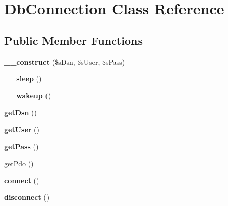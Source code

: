 \hypertarget{class_db_connection}{\section{Db\-Connection Class Reference}
\label{class_db_connection}
}
\subsection*{Public Member Functions}
\begin{DoxyCompactItemize}
\item 
\hypertarget{class_db_connection_a3b56a065a8591f3b8324b84aa2b6e99d}{{\bfseries \-\_\-\-\_\-construct} (\$s\-Dsn, \$s\-User, \$s\-Pass)}\label{class_db_connection_a3b56a065a8591f3b8324b84aa2b6e99d}

\item 
\hypertarget{class_db_connection_a2f87a9eaf06f135a323c3a4f429ecc11}{{\bfseries \-\_\-\-\_\-sleep} ()}\label{class_db_connection_a2f87a9eaf06f135a323c3a4f429ecc11}

\item 
\hypertarget{class_db_connection_a9fab9b70298e9bef12906e3b3431f3c3}{{\bfseries \-\_\-\-\_\-wakeup} ()}\label{class_db_connection_a9fab9b70298e9bef12906e3b3431f3c3}

\item 
\hypertarget{class_db_connection_a945af842314b399eca5af3c386f006bd}{{\bfseries get\-Dsn} ()}\label{class_db_connection_a945af842314b399eca5af3c386f006bd}

\item 
\hypertarget{class_db_connection_a8a2466ed0cfd8ad83c8567cbd7508dfa}{{\bfseries get\-User} ()}\label{class_db_connection_a8a2466ed0cfd8ad83c8567cbd7508dfa}

\item 
\hypertarget{class_db_connection_a52ff2ae755efaa935c79e09f0ac690a0}{{\bfseries get\-Pass} ()}\label{class_db_connection_a52ff2ae755efaa935c79e09f0ac690a0}

\item 
\hyperlink{class_db_connection_a02ad97e6bc80a2caa7d440327f2b5483}{get\-Pdo} ()
\item 
\hypertarget{class_db_connection_a42741e1c5c39cb28b3ec47d7ac69a315}{{\bfseries connect} ()}\label{class_db_connection_a42741e1c5c39cb28b3ec47d7ac69a315}

\item 
\hypertarget{class_db_connection_a4876746134e556f69028877d061083ed}{{\bfseries disconnect} ()}\label{class_db_connection_a4876746134e556f69028877d061083ed}


\end{DoxyCompactItemize}

